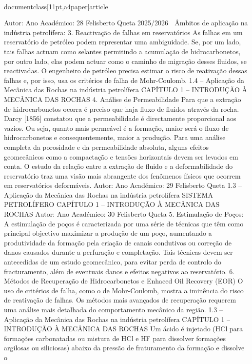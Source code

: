 \\documentclass[11pt,a4paper]{article}
\begin{document}
Autor:
Ano Académico:
28
Felisberto Queta
2025/2026

 Âmbitos de aplicação na indústria petrolífera:
3. Reactivação de falhas em reservatórios
As falhas em um reservatório de petróleo podem representar uma ambiguidade.
Se, por um lado, tais falhas actuam como selantes permitindo a acumulação de hidrocarbonetos, por outro lado, 
elas podem actuar como o caminho de migração desses fluidos, se reactivadas.
O engenheiro de petróleo precisa estimar o risco de reativação dessas falhas e, por isso, usa os critérios de falha 
de Mohr-Coulomb.
1.4 – Aplicação da Mecânica das Rochas na indústria petrolífera
CAPÍTULO 1 
–
 INTRODUÇÃO À MECÂNICA DAS 
ROCHAS     
4. Análise de Permeabilidade
Para que a extração de hidrocarbonetos ocorra é preciso que haja fluxo de fluidos através da rocha. Darcy [1856]
constatou que a permeabilidade é directamente proporcional aos vazios. Ou seja, quanto mais permeável é a
formação, maior será o fluxo de hidrocarbonetos e consequentemente, maior a produção.
Para uma análise completa da porosidade e da permeabilidade absoluta, alguns efeitos geomecânicos como a
compactação e tensões horizontais devem ser levados em conta.
O estudo da relação entre a extração de fluido e a deformabilidade do reservatório traz uma visão mais
abrangente dos fenômenos físicos que ocorrem em reservatórios deformáveis.
Autor:
Ano Académico:
29
Felisberto Queta
1.3 – Aplicação da Mecânica das Rochas na indústria petrolífera
SISTEMA PETROLÍFERO
CAPÍTULO 1 
–
 INTRODUÇÃO À MECÂNICA DAS ROCHAS
Autor:
Ano Académico:
30
Felisberto Queta
5. Estimulação de Poços:
A estimulação de poços é caracterizada por uma série de técnicas que têm como principal objectivo maximizar a
produção de um poço, aumentando a produtividade da formação pela criação de canais condutivos ou correção
de danos causados durante a perfuração e completação.
Tais técnicas devem ser antecedidas de um estudo geomecânico, para evitar perda de controlo do fracturamento,
além de eventuais danos e efeitos negativos ao reservatório.
6. Métodos de Recuperação de Hidrocarbonetos e Enhaced Oil Recovery (EOR)
O uso de critérios de falha, como o de Mohr-Coulomb, mostra a iminência do risco de reativação de
falhas. Os métodos mais avançados de recuperação requerem uma análise mais detalhada do
comportamento mecânico da região.
1.3 – Aplicação da Mecânica das Rochas na indústria petrolífera
CAPÍTULO 1 
–
 INTRODUÇÃO À MECÂNICA DAS ROCHAS
Um ácido é injetado (HCl
para formações 
carbonatadas ou mistura de 
HCl e HF para dissolver 
formações argilosas ou 
siliciosas) abaixo da 
pressão de fraturamento
da formação e dissolve o 
\end{document}
